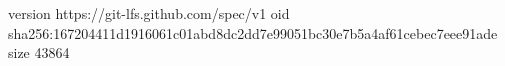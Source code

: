 version https://git-lfs.github.com/spec/v1
oid sha256:167204411d1916061c01abd8dc2dd7e99051bc30e7b5a4af61cebec7eee91ade
size 43864
